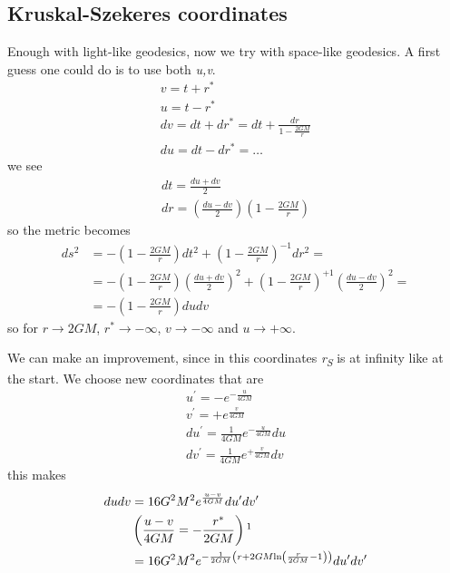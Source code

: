 \subsection{Kruskal-Szekeres coordinates}
Enough with light-like geodesics, now we try with space-like geodesics. A first guess one could do is to use both \emph{u,v}. 
\begin{gather*}
v = t + r^{*} \\
u = t - r^{*}\\
dv = dt + dr^{*} = dt + \frac{d r}{ 1 - \frac{2GM}{r}}\\
du = dt - dr^{*} = \ldots 
\end{gather*}
we see 
\begin{gather*}
dt = \frac{du + dv}{2} \\
dr = \left( \frac{du-dv}{2} \right)\left( 1- \frac{2GM}{r} \right)
\end{gather*}
so the metric becomes
\begin{align}
	ds^{2} &= - \left( 1- \frac{2GM}{r} \right)dt^{2} + \left( 1 - \frac{2GM}{r} \right)^{-1} dr^{2} = \\
	       &= - \left( 1 - \frac{2GM}{r}  \right)\left( \frac{du + dv}{2} \right)^{2} + \left( 1 - \frac{2GM}{r} \right) ^{+1} \left( \frac{du - dv}{2} \right)^{2} = \\
	       &= - \left( 1 - \frac{2GM}{r} \right)dudv
\end{align}
so for $r \to  2GM$, $r^{*}\to  -\infty$, $v \to  -\infty$ and $u \to +\infty$.\par
We can make an improvement, since in this coordinates \emph{r\textsubscript{S}} is at infinity like at the start. We choose new coordinates that are
\begin{gather*}
u^{\prime } = -e ^{- \frac{u}{4GM}} \\
v^{\prime } = + e ^{\frac{v}{4GM}}\\
du^{\prime } = \frac{1}{4GM} e^{-\frac{u}{4GM}}du\\
dv^{\prime } = \frac{1}{4GM} e^{+\frac{v}{4GM}}dv
\end{gather*}
this makes
\begin{align}
	dudv &= 16G^{2}M^{2} e^{ \frac{u-v}{4GM}} du^{\prime }dv^{\prime }\\
	     &\left( \frac{u-v}{4GM} = -\frac{r^{*}}{2GM} \right)\footnotemark \\
	     &=16G^{2}M^{2} e^{ -\frac{1}{2GM} \left( r + 2GM \text{ln}\left( \frac{r}{2GM} -1 \right)	 \right)} du^{\prime }dv^{\prime }
\end{align}
